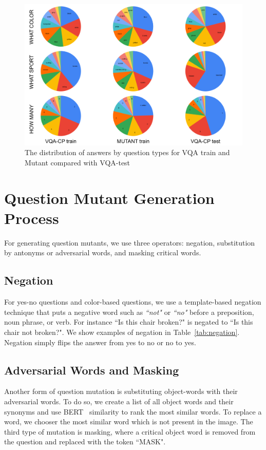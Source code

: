 

\begin{figure}[t!]
    \centering
    \includegraphics[width=\linewidth]{ figures/a_distrib.png}
    \caption{The distribution of answers by question types for VQA train and Mutant compared with VQA-test}
    \label{fig:a_distrib}
\end{figure}


\section{Question Mutant Generation Process}
For generating question mutants, we use three operators: negation, substitution by antonyms or adversarial words, and masking critical words. 

    \subsection{Negation}
    
    For yes-no questions and color-based questions, we use a template-based negation technique that puts a negative word such as \textit{``not"} or \textit{``no"} before a preposition, noun phrase, or verb.
    For instance ``Is this chair broken?" is negated to ``Is this chair not broken?".
    We show examples of negation in Table~\ref{tab:negation}.
    Negation simply flips the answer from yes to no or no to yes.
    
    \subsection{Adversarial Words and Masking}
    Another form of question mutation is substituting object-words with their adversarial words.
    To do so, we create a list of all object words and their synonyms and use BERT~\cite{devlin2018bert} similarity to rank the most similar words.
    To replace a word, we chooser the most similar word which is not present in the image.
    The third type of mutation is masking, where a critical object word is removed from the question and replaced with the token ``MASK".
    
